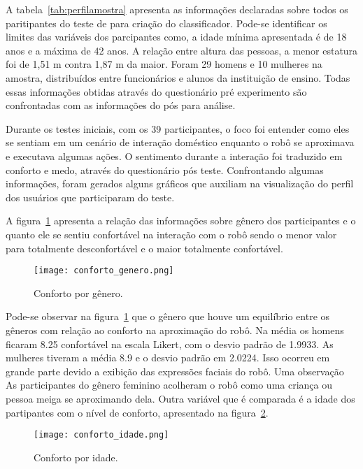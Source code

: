 A tabela~\ref{tab:perfilamostra} apresenta as informações declaradas sobre todos os paritipantes do teste de para criação do classificador. Pode-se identificar os limites das variáveis dos parcipantes como, a idade mínima apresentada é de 18 anos e a máxima de 42 anos. A relação entre altura das pessoas, a menor estatura foi de 1,51 m contra 1,87 m da maior. Foram 29 homens e 10 mulheres na amostra, distribuídos entre funcionários e alunos da instituição de ensino. Todas essas informações obtidas através do questionário pré experimento são confrontadas com as informações do pós para análise.

Durante os testes iniciais, com os 39 participantes, o foco foi entender como eles se sentiam em um cenário de interação doméstico enquanto o robô se aproximava e executava algumas ações. O sentimento durante a interação foi traduzido em conforto e medo, através do questionário pós teste. Confrontando algumas informações, foram gerados alguns gráficos que auxiliam na visualização do perfil dos usuários que participaram do teste.

A figura~\ref{fig:confortogenero} apresenta a relação das informações sobre gênero dos participantes e o quanto ele se sentiu confortável na interação com o robô sendo o menor valor para totalmente desconfortável e o maior totalmente confortável.

\begin{figure}[ht!]
	\centering
	\begin{minipage}{0.65\textwidth}
		\caption{Conforto por gênero.}
		\texttt{[image: conforto\_genero.png]}
		\label{fig:confortogenero}
	\end{minipage}
\end{figure}

Pode-se observar na figura~\ref{fig:confortogenero} que o gênero que houve um equilíbrio entre os gêneros com relação ao conforto na aproximação do robô. Na média os homens ficaram 8.25 confortável na escala Likert, com o desvio padrão de 1.9933. As mulheres tiveram a média 8.9 e o desvio padrão em 2.0224. Isso ocorreu em grande parte devido a exibição das expressões faciais do robô. Uma observação As participantes do gênero feminino acolheram o robô como uma criança ou pessoa meiga se aproximando dela. Outra variável que é comparada é a idade dos partipantes com o nível de conforto, apresentado na figura~\ref{fig:confortoidade}.

\begin{figure}[ht!]
	\centering
	\begin{minipage}{0.65\textwidth}
		\caption{Conforto por idade.}
		\texttt{[image: conforto\_idade.png]}
		\label{fig:confortoidade}
	\end{minipage}
\end{figure}

